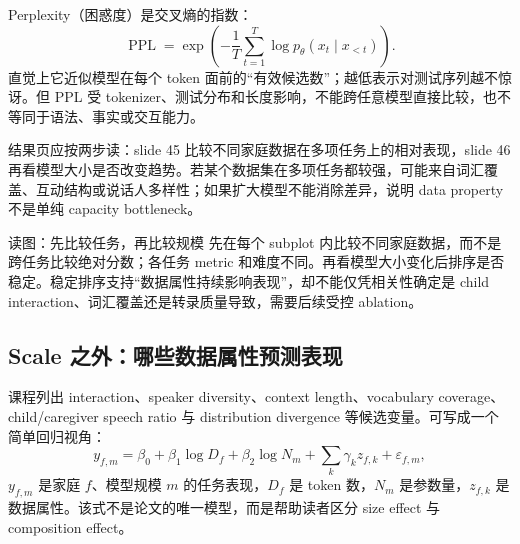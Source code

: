 

Perplexity（困惑度）是交叉熵的指数：
\[
\operatorname{PPL}=\exp\!\left(-\frac{1}{T}\sum_{t=1}^{T}\log p_{\theta}(x_t\mid x_{<t})\right).
\]
直觉上它近似模型在每个 token 面前的“有效候选数”；越低表示对测试序列越不惊讶。但 PPL 受 tokenizer、测试分布和长度影响，不能跨任意模型直接比较，也不等同于语法、事实或交互能力。

结果页应按两步读：slide 45 比较不同家庭数据在多项任务上的相对表现，slide 46 再看模型大小是否改变趋势。若某个数据集在多项任务都较强，可能来自词汇覆盖、互动结构或说话人多样性；如果扩大模型不能消除差异，说明 data property 不是单纯 capacity bottleneck。



\begin{knowledgebox}{读图：先比较任务，再比较规模}
先在每个 subplot 内比较不同家庭数据，而不是跨任务比较绝对分数；各任务 metric 和难度不同。再看模型大小变化后排序是否稳定。稳定排序支持“数据属性持续影响表现”，却不能仅凭相关性确定是 child interaction、词汇覆盖还是转录质量导致，需要后续受控 ablation。
\end{knowledgebox}

\subsection{Scale 之外：哪些数据属性预测表现}

课程列出 interaction、speaker diversity、context length、vocabulary coverage、child/caregiver speech ratio 与 distribution divergence 等候选变量。可写成一个简单回归视角：
\[
y_{f,m}=\beta_0+\beta_1\log D_f+\beta_2\log N_m
+\sum_k\gamma_k z_{f,k}+\varepsilon_{f,m},
\]
$y_{f,m}$ 是家庭 $f$、模型规模 $m$ 的任务表现，$D_f$ 是 token 数，$N_m$ 是参数量，$z_{f,k}$ 是数据属性。该式不是论文的唯一模型，而是帮助读者区分 size effect 与 composition effect。




